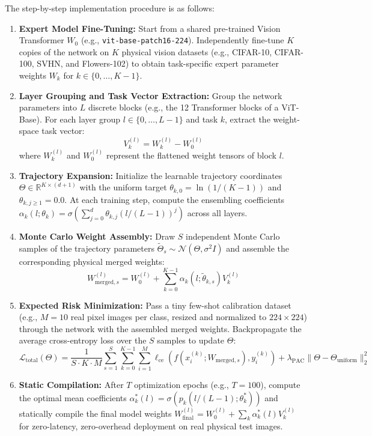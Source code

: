 The step-by-step implementation procedure is as follows:
\begin{enumerate}
    \item \textbf{Expert Model Fine-Tuning:} Start from a shared pre-trained Vision Transformer $W_0$ (e.g., \texttt{vit-base-patch16-224}). Independently fine-tune $K$ copies of the network on $K$ physical vision datasets (e.g., CIFAR-10, CIFAR-100, SVHN, and Flowers-102) to obtain task-specific expert parameter weights $W_k$ for $k \in \{0, \dots, K-1\}$.
    \item \textbf{Layer Grouping and Task Vector Extraction:} Group the network parameters into $L$ discrete blocks (e.g., the 12 Transformer blocks of a ViT-Base). For each layer group $l \in \{0, \dots, L-1\}$ and task $k$, extract the weight-space task vector:
    \begin{equation}
    V_k^{(l)} = W_k^{(l)} - W_0^{(l)}
    \end{equation}
    where $W_k^{(l)}$ and $W_0^{(l)}$ represent the flattened weight tensors of block $l$.
    \item \textbf{Trajectory Expansion:} Initialize the learnable trajectory coordinates $\Theta \in \mathbb{R}^{K \times (d+1)}$ with the uniform target $\theta_{k,0} = \ln(1/(K-1))$ and $\theta_{k,j \ge 1} = 0.0$. At each training step, compute the ensembling coefficients $\alpha_k(l; \theta_k) = \sigma\left(\sum_{j=0}^d \theta_{k,j} (l/(L-1))^j \right)$ across all layers.
    \item \textbf{Monte Carlo Weight Assembly:} Draw $S$ independent Monte Carlo samples of the trajectory parameters $\tilde{\Theta}_s \sim \mathcal{N}(\Theta, \sigma^2 I)$ and assemble the corresponding physical merged weights:
    \begin{equation}
    W_{\text{merged}, s}^{(l)} = W_0^{(l)} + \sum_{k=0}^{K-1} \alpha_k(l; \tilde{\theta}_{k, s}) V_k^{(l)}
    \end{equation}
    \item \textbf{Expected Risk Minimization:} Pass a tiny few-shot calibration dataset (e.g., $M = 10$ real pixel images per class, resized and normalized to $224 \times 224$) through the network with the assembled merged weights. Backpropagate the average cross-entropy loss over the $S$ samples to update $\Theta$:
    \begin{equation}
    \mathcal{L}_{\text{total}}(\Theta) = \frac{1}{S \cdot K \cdot M} \sum_{s=1}^S \sum_{k=0}^{K-1} \sum_{i=1}^M \ell_{\text{ce}}\left(f\left(x_i^{(k)}; W_{\text{merged}, s}\right), y_i^{(k)}\right) + \lambda_{\text{PAC}} \|\Theta - \Theta_{\text{uniform}}\|_2^2
    \end{equation}
    \item \textbf{Static Compilation:} After $T$ optimization epochs (e.g., $T=100$), compute the optimal mean coefficients $\alpha_k^*(l) = \sigma(p_k(l/(L-1); \theta_k^*))$ and statically compile the final model weights $W_{\text{final}}^{(l)} = W_0^{(l)} + \sum_k \alpha_k^*(l) V_k^{(l)}$ for zero-latency, zero-overhead deployment on real physical test images.
\end{enumerate}

